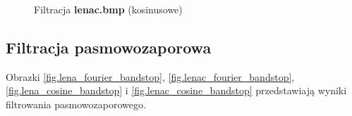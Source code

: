 \documentclass{classrep}
\begin{document}
\begin{figure}
{  \label{fig.lenac_cosine_bandpass_0_2_0_8}
 }
\caption{Filtracja \textbf{lenac.bmp} (kosinusowe)}
\label{fig.lenac_cosine_bandpass}
\end{figure}

\subsection{Filtracja pasmowozaporowa}
Obrazki \ref{fig.lena_fourier_bandstop}, \ref{fig.lenac_fourier_bandstop}, \ref{fig.lena_cosine_bandstop} i \ref{fig.lenac_cosine_bandstop} przedstawiają wyniki filtrowania pasmowozaporowego.
\end{document}
